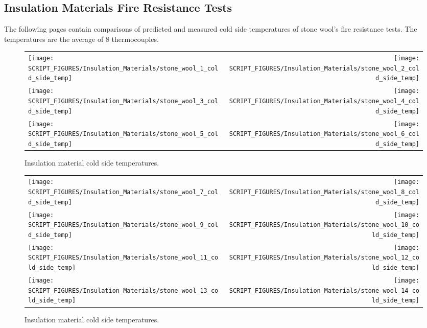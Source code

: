 \clearpage

\subsection{Insulation Materials Fire Resistance Tests}

The following pages contain comparisons of predicted and measured cold side temperatures of stone wool's fire resistance tests. The temperatures are the average of 8 thermocouples. 

\begin{figure}[h]
	\begin{tabular*}{\textwidth}{l@{\extracolsep{\fill}}r}
		\texttt{[image: SCRIPT\_FIGURES/Insulation\_Materials/stone\_wool\_1\_cold\_side\_temp]} &
		\texttt{[image: SCRIPT\_FIGURES/Insulation\_Materials/stone\_wool\_2\_cold\_side\_temp]} \\
		\texttt{[image: SCRIPT\_FIGURES/Insulation\_Materials/stone\_wool\_3\_cold\_side\_temp]} &
		\texttt{[image: SCRIPT\_FIGURES/Insulation\_Materials/stone\_wool\_4\_cold\_side\_temp]} \\
		\texttt{[image: SCRIPT\_FIGURES/Insulation\_Materials/stone\_wool\_5\_cold\_side\_temp]} &
		\texttt{[image: SCRIPT\_FIGURES/Insulation\_Materials/stone\_wool\_6\_cold\_side\_temp]}
	\end{tabular*}
	\caption[Insulation material cold side temperatures]{Insulation material cold side temperatures.}
\end{figure}

\begin{figure}[p]
	\begin{tabular*}{\textwidth}{l@{\extracolsep{\fill}}r}
		\texttt{[image: SCRIPT\_FIGURES/Insulation\_Materials/stone\_wool\_7\_cold\_side\_temp]} &
		\texttt{[image: SCRIPT\_FIGURES/Insulation\_Materials/stone\_wool\_8\_cold\_side\_temp]} \\
		\texttt{[image: SCRIPT\_FIGURES/Insulation\_Materials/stone\_wool\_9\_cold\_side\_temp]} &
		\texttt{[image: SCRIPT\_FIGURES/Insulation\_Materials/stone\_wool\_10\_cold\_side\_temp]} \\
		\texttt{[image: SCRIPT\_FIGURES/Insulation\_Materials/stone\_wool\_11\_cold\_side\_temp]} &
		\texttt{[image: SCRIPT\_FIGURES/Insulation\_Materials/stone\_wool\_12\_cold\_side\_temp]} \\
		\texttt{[image: SCRIPT\_FIGURES/Insulation\_Materials/stone\_wool\_13\_cold\_side\_temp]} &
		\texttt{[image: SCRIPT\_FIGURES/Insulation\_Materials/stone\_wool\_14\_cold\_side\_temp]}
	\end{tabular*}
	\caption[Insulation material cold side temperatures]{Insulation material cold side temperatures.}
\end{figure}


